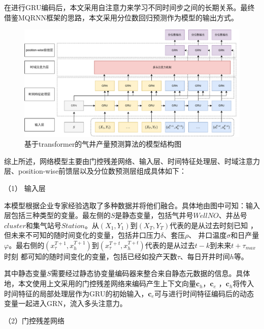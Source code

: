 在进行GRU编码后，本文采用自注意力来学习不同时间步之间的长期关系。最终借鉴MQRNN框架\cite{wen2018multihorizon}的思路，本文采用分位数回归预测作为模型的输出方式。

\begin{figure}[H]
    \centering
    \includegraphics[width=.99\linewidth]{figure/基于Transformer的算法.vision.pdf}
    \caption{基于transformer的气井产量预测算法的模型结构图}
    \label{fig:TFT}
\end{figure}

综上所述，网络模型主要由门控残差网络、输入层、时间特征处理层、时域注意力层、position-wise前馈层以及分位数预测层组成具体如下：

（1） 输入层

本模型根据企业专家经验选取了多种数据并将他们融合。具体地由图中可知：输入层包括三种类型的变量。最左侧的$S$是静态变量，包括气井号$WellNO$、井丛号$cluster$和集气站号$Station$。从$(X_1, Y_1)$到$(X_{T}, Y_{T})$代表的是从过去时刻已知
，但未来不可知的随时间变化的变量，包括井口压力\( \delta \)、套压\( \rho \)、
井口温度\( \sigma \)和日产量$\varphi $。最右侧的$(x^{T+1}_{\tau }, x^{T+1}_{h })$到$(x^{T+t}_{\tau }, x^{T+t}_{h})$代表的是从过去$t-k$到未来$t+\tau_{max}$时刻
都可知的随时间变化的变量，包括已经如投产天数\( \tau \)、每日开井时间$h$等。

其中静态变量$S$需要经过静态协变量编码器来整合来自静态元数据的信息。具体地，本文使用上文采用的门控残差网络来编码产生上下文向量$\mathbf{c}_h$，$\mathbf{c}_e$
，$\mathbf{c}_h$将传入时间特征的局部处理层作为GRU的初始输入，$\mathbf{c}_e$可与进行时间特征编码后的动态变量一起进入GRN，流入多头注意力。

（2）门控残差网络

